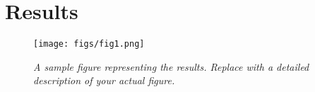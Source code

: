 \section{Results}

\lipsum[4] %

\begin{figure}[H] %
    \centering
        \texttt{[image: figs/fig1.png]} %
        \caption{\textit{A sample figure representing the results. Replace with a detailed description of your actual figure.}} %
        \label{fig:results-figure}
 
\end{figure}

